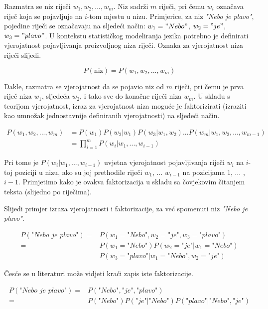 \documentclass[times, utf8, diplomski, numeric]{fer}
\begin{document}
Razmatra se niz riječi $w_1, w_2, ... , w_m$. Niz sadrži $m$ riječi, pri čemu $w_i$ označava riječ koja se pojavljuje na $i$-tom mjestu u nizu. Primjerice, za niz \textit{"Nebo je plavo"}, pojedine riječi se označavaju na sljedeći način: $w_1="Nebo"$, $w_2="je"$, $w_3="plavo"$. U kontekstu statističkog modeliranja jezika potrebno je definirati vjerojatnost pojavljivanja proizvoljnog niza riječi. Oznaka za vjerojatnost niza riječi slijedi.

\[
P(\text{niz}) = P(w_1, w_2, ... , w_m)
\]

Dakle, razmatra se vjerojatnost da se pojavio niz od $m$ riječi, pri čemu je prva riječ niza $w_1$, sljedeća $w_2$, i tako sve do konačne riječi niza $w_m$. U skladu s teorijom vjerojatnost, izraz za vjerojatnost niza moguće je faktorizirati (izraziti kao umnožak jednostavnije definiranih vjerojatnosti) na sljedeći način.

\begin{align*}
P(w_1, w_2, ... , w_m)
  &= P(w_1) P(w_2 | w_1) P(w_3 | w_1, w_2) ... P(w_m | w_1, w_2, ... , w_{m - 1 }) \\
  &= \prod_{i = 1}^m{P(w_i|w_1, ... , w_{i - 1})}
\end{align*}

Pri tome je $P(w_i | w_1, ... , w_{i - 1})$ uvjetna vjerojatnost pojavljivanja riječi $w_i$ na $i$-toj poziciji u nizu, ako su joj prethodile riječi $w_1$, ... $w_{i - 1}$ na pozicijama $1$, ... , $i - 1$. Primjetimo kako je ovakva faktorizacija u skladu sa čovjekovim čitanjem teksta (slijedno po riječima).

Slijedi primjer izraza vjerojatnosti i faktorizacije, za već spomenuti niz \textit{"Nebo je plavo"}.

\begin{align*}
P(\textit{"Nebo je plavo"})
  = &P(w_1=\textit{"Nebo"}, w_2=\textit{"je"}, w_3=\textit{"plavo"}) \\
  = &P(w_1=\textit{"Nebo"}) P(w_2=\textit{"je"} | w_1=\textit{"Nebo"}) \\
  &P(w_3=\textit{"plavo"} | w_1=\textit{"Nebo"}, w_2=\textit{"je"})
\end{align*}

Česće se u literaturi može vidjeti kraći zapis iste faktorizacije.

\begin{align*}
P(\textit{"Nebo je plavo"})
  = &P(\textit{"Nebo"}, \textit{"je"}, \textit{"plavo"}) \\
  = &P(\textit{"Nebo"}) P(\textit{"je"} | \textit{"Nebo"}) P(\textit{"plavo"} | \textit{"Nebo"}, \textit{"je"})
\end{align*}
\end{document}
